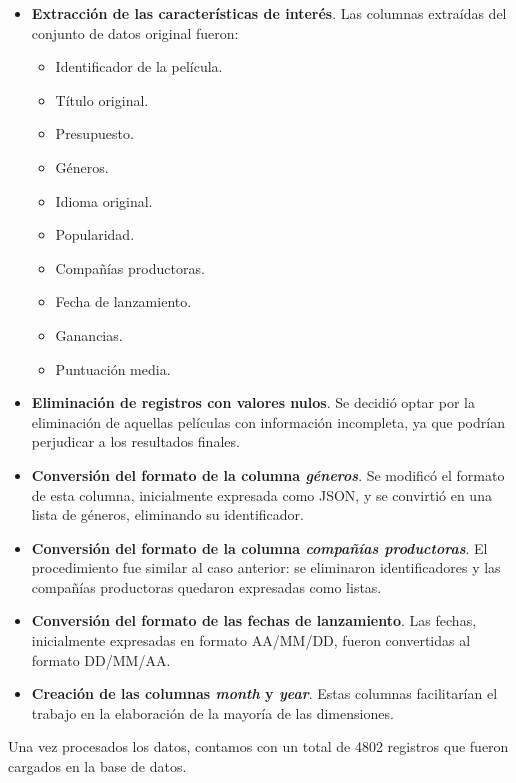 \documentclass[11pt,a4paper]{article}
\begin{document}
\begin{itemize}
\item \textbf{Extracción de las características de interés}. Las columnas extraídas del conjunto de datos original fueron:

	\begin{itemize}
	\item Identificador de la película.
	\item Título original.
	\item Presupuesto.
	\item Géneros.
	\item Idioma original.
	\item Popularidad.
	\item Compañías productoras.
	\item Fecha de lanzamiento.
	\item Ganancias.
	\item Puntuación media.
	\end{itemize}

\item \textbf{Eliminación de registros con valores nulos}. Se decidió optar por la eliminación de aquellas películas con información incompleta, ya que podrían perjudicar a los resultados finales.

\item \textbf{Conversión del formato de la columna \textit{géneros}}. Se modificó el formato de esta columna, inicialmente expresada como JSON, y se convirtió en una lista de géneros, eliminando su identificador.

\item \textbf{Conversión del formato de la columna \textit{compañías productoras}}. El procedimiento fue similar al caso anterior: se eliminaron identificadores y las compañías productoras quedaron expresadas como listas.

\item \textbf{Conversión del formato de las fechas de lanzamiento}. Las fechas, inicialmente expresadas en formato AA/MM/DD, fueron convertidas al formato DD/MM/AA.

\item \textbf{Creación de las columnas \textit{month} y \textit{year}}. Estas columnas facilitarían el trabajo en la elaboración de la mayoría de las dimensiones.

\end{itemize}

Una vez procesados los datos, contamos con un total de 4802 registros que fueron cargados en la base de datos.
\end{document}
